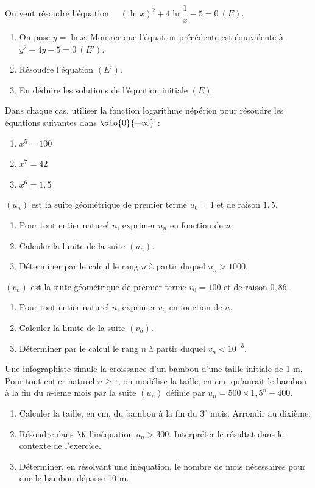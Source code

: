 \documentclass[a4paper,11pt,exos]{nsi} %
\begin{document}
\exo{ \faStar}
On veut résoudre l'équation $\quad \left(\ln x\right)^2+4\ln \dfrac{1}{x}-5=0\ (E)$.
\begin{enumerate}
    \item On pose $y=\ln x$. Montrer que l'équation précédente est équivalente à $y^2-4y-5=0\ (E')$.
    \item Résoudre l'équation $(E')$.
    \item En déduire les solutions de l'équation initiale $(E)$.
\end{enumerate}

\exo{}
Dans chaque cas, utiliser la fonction logarithme népérien pour résoudre les équations suivantes dans $\oio{0}{+\infty}$ :
\begin{multicols}{3}
    \begin{enumerate}
        \item $x^5=100$
        \item $x^7=42$
        \item $x^6=1,5$
    \end{enumerate}
\end{multicols}

\exo{}
$(u_n)$ est la suite géométrique de premier terme $u_0=4$ et de raison $1,5$.
\begin{enumerate}
    \item Pour tout entier naturel $n$, exprimer $u_n$ en fonction de $n$.
    \item Calculer la limite de la suite $(u_n)$.
    \item Déterminer par le calcul le rang $n$ à partir duquel $u_n>1000$.
\end{enumerate}

\exo{}
$(v_n)$ est la suite géométrique de premier terme $v_0=100$ et de raison $0,86$.
\begin{enumerate}
    \item Pour tout entier naturel $n$, exprimer $v_n$ en fonction de $n$.
    \item Calculer la limite de la suite $(v_n)$.
    \item Déterminer par le calcul le rang $n$ à partir duquel $v_n<10^{-3}$.
\end{enumerate}

\exo{}
Une infographiste simule la croissance d'un bambou d'une taille initiale de 1 m.\\
Pour tout entier naturel $n\geqslant 1$, on modélise la taille, en cm, qu'aurait le bambou à la fin du $n$-ième mois par la suite $(u_n)$ définie par $u_n=500\times 1,5^n-400$.
\begin{enumerate}
    \item Calculer la taille, en cm, du bambou à la fin du 3$^{\text{e}}$ mois. Arrondir au dixième.
    \item Résoudre dans $\N$ l'inéquation $u_n>300$. Interpréter le résultat dans le contexte de l'exercice.
    \item Déterminer, en résolvant une inéquation, le nombre de mois nécessaires pour que le bambou dépasse 10 m.
\end{enumerate}
\end{document}
